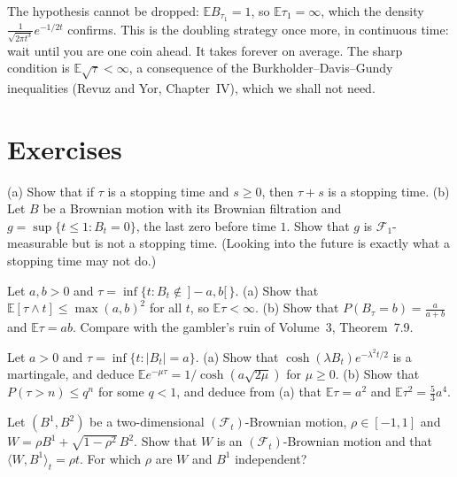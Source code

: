 \begin{remark}
The hypothesis cannot be dropped: $\mathbb EB_{\tau_1}=1$, so $\mathbb E\tau_1=\infty$, which the density $\frac1{\sqrt{2\pi t^3}}e^{-1/2t}$ confirms. This is the doubling strategy once more, in continuous time:
wait until you are one coin ahead. It takes forever on average. The sharp condition is $\mathbb E\sqrt\tau<\infty$, a consequence of the Burkholder--Davis--Gundy inequalities (Revuz and Yor, Chapter~IV),
which we shall not need.
\end{remark}

\section{Exercises}

\begin{exercise}[$\star\star$]\label{ex:lastzero}
(a) Show that if $\tau$ is a stopping time and $s\ge0$, then $\tau+s$ is a stopping time. (b) Let $B$ be a Brownian motion with its Brownian filtration and $g=\sup\{t\le1:B_t=0\}$, the last zero before
time $1$. Show that $g$ is $\mathcal F_1$-measurable but is not a stopping time. (Looking into the future is exactly what a stopping time may not do.)
\end{exercise}

\begin{exercise}[$\star$]\label{ex:exit}
Let $a,b>0$ and $\tau=\inf\{t:B_t\notin\,]-a,b[\,\}$. (a) Show that $\mathbb E[\tau\wedge t]\le\max(a,b)^2$ for all $t$, so $\mathbb E\tau<\infty$. (b) Show that $P(B_\tau=b)=\frac a{a+b}$ and $\mathbb E\tau=ab$.
Compare with the gambler's ruin of Volume~3, Theorem~7.9.
\end{exercise}

\begin{exercise}[$\star\star$]\label{ex:cosh}
Let $a>0$ and $\tau=\inf\{t:|B_t|=a\}$. (a) Show that $\cosh(\lambda B_t)e^{-\lambda^2t/2}$ is a martingale, and deduce $\mathbb Ee^{-\mu\tau}=1/\cosh(a\sqrt{2\mu})$ for $\mu\ge0$. (b) Show that $P(\tau>n)\le q^n$
for some $q<1$, and deduce from (a) that $\mathbb E\tau=a^2$ and $\mathbb E\tau^2=\frac53a^4$.
\end{exercise}

\begin{exercise}[$\star$]\label{ex:correlated}
Let $(B^1,B^2)$ be a two-dimensional $(\mathcal F_t)$-Brownian motion, $\rho\in[-1,1]$ and $W=\rho B^1+\sqrt{1-\rho^2}\,B^2$. Show that $W$ is an $(\mathcal F_t)$-Brownian motion and that $\langle W,B^1\rangle_t=\rho t$.
For which $\rho$ are $W$ and $B^1$ independent?
\end{exercise}

